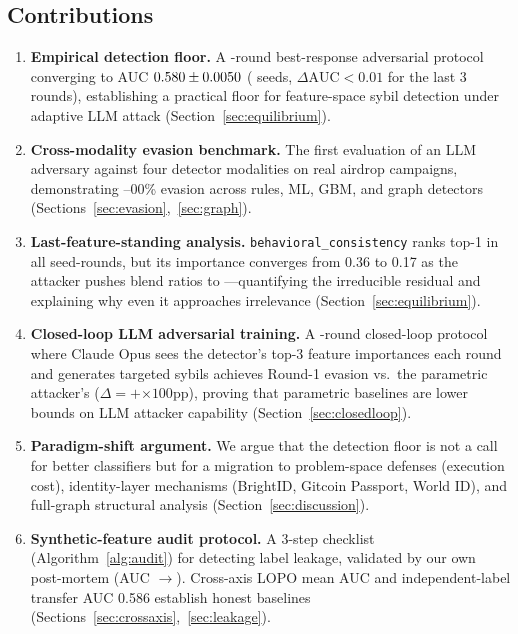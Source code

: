\documentclass[sigconf,nonacm=false]{acmart}
\begin{document}
\subsection{Contributions}

\begin{enumerate}
  \item \textbf{Empirical detection floor.} A \bestResponseNRounds{}-round best-response adversarial protocol converging to AUC $0.580{} \pm 0.0050{}$ (\bestResponseNSeeds{} seeds, $\Delta\text{AUC}{<}0.01$ for the last 3 rounds), establishing a practical floor for feature-space sybil detection under adaptive LLM attack (Section~\ref{sec:equilibrium}).
  \item \textbf{Cross-modality evasion benchmark.} The first evaluation of an LLM adversary against four detector modalities on \largeScaleNProjects{} real airdrop campaigns, demonstrating \evasionGraphModerate{}--\evasionGraphAdvanced{}00\% evasion across rules, ML, GBM, and graph detectors (Sections~\ref{sec:evasion},~\ref{sec:graph}).
  \item \textbf{Last-feature-standing analysis.} \texttt{behavioral\_consistency} ranks top-1 in all \behavioralConsistencyTopTotalRounds{} seed-rounds, but its importance converges from 0.36 to 0.17 as the attacker pushes blend ratios to \bestResponseEquilibriumBlendMean{}---quantifying the irreducible residual and explaining why even it approaches irrelevance (Section~\ref{sec:equilibrium}).
  \item \textbf{Closed-loop LLM adversarial training.} A \bestResponseNRounds{}-round closed-loop protocol where Claude Opus sees the detector's top-3 feature importances each round and generates targeted sybils achieves Round-1 evasion \closedLoopRoundLlmEvasionMean{} vs.\ the parametric attacker's \closedLoopRoundParametricEvasionMean{} ($\Delta{=}+$\closedLoopRoundEvasionDelta{}$\times 100$pp), proving that parametric baselines are lower bounds on LLM attacker capability (Section~\ref{sec:closedloop}).
  \item \textbf{Paradigm-shift argument.} We argue that the \bestResponseAucFloorMean{} detection floor is not a call for better classifiers but for a migration to problem-space defenses (execution cost), identity-layer mechanisms (BrightID, Gitcoin Passport, World ID), and full-graph structural analysis (Section~\ref{sec:discussion}).
  \item \textbf{Synthetic-feature audit protocol.} A 3-step checklist (Algorithm~\ref{alg:audit}) for detecting label leakage, validated by our own post-mortem (AUC \leakageFixLeakyAuc{}$\to$\leakageFixHonestAuc{}). Cross-axis LOPO mean AUC \largeScaleCrossAxisGbmMeanAuc{} and independent-label transfer AUC 0.586 establish honest baselines (Sections~\ref{sec:crossaxis},~\ref{sec:leakage}).
\end{enumerate}
\end{document}
